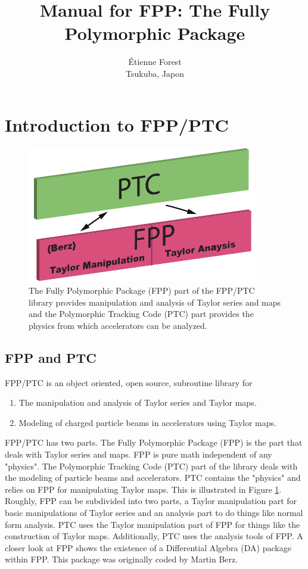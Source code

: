 \documentclass[english,12pt,article]{article} %
\title{ \protect \large Manual for FPP:   The Fully Polymorphic Package}
\author{Étienne Forest \\ Tsukuba, Japon }
\def\Fig#1{\rm Figure {\rm \ref{#1}}}
\begin{document}
 
\maketitle

\newpage 
{\footnotesize
\tableofcontents %
}
\newpage 

\section{Introduction to FPP/PTC}
\label{sec:fppptc}

\begin{figure}[tb]
  \centering
  \includegraphics{FPP-PTC.pdf}
  \caption{The Fully Polymorphic Package (FPP) part of the FPP/PTC library provides manipulation and analysis of Taylor series and maps and the Polymorphic Tracking Code (PTC) part provides the physics from which accelerators can be analyzed.}
  \label{f:fpp-ptc}
\end{figure}

\subsection{FPP and PTC}

FPP/PTC is an object oriented, open source, subroutine library for
\begin{enumerate}
\item The manipulation and analysis of Taylor series and Taylor maps.
\item Modeling of charged particle beams in accelerators using Taylor maps.
\end{enumerate}

FPP/PTC has two parts. The Fully Polymorphic Package (FPP) is the part that deals with Taylor series and maps. FPP is pure math independent of any "physics". The Polymorphic Tracking Code (PTC) part of the library deals with the modeling of particle beams and accelerators. PTC contains the "physics" and relies on FPP for manipulating Taylor maps. This is illustrated in \Fig{f:fpp-ptc}. Roughly, FPP can be subdivided into two parts, a Taylor manipulation part for basic manipulations of Taylor series and an analysis part to do things like normal form analysis. PTC uses the Taylor manipulation part of FPP for things like the construction of Taylor maps. Additionally, PTC uses the analysis tools of FPP. A closer look at FPP shows the existence of a Differential Algebra (DA) package within FPP. This package was originally coded by Martin Berz.
\end{document}
